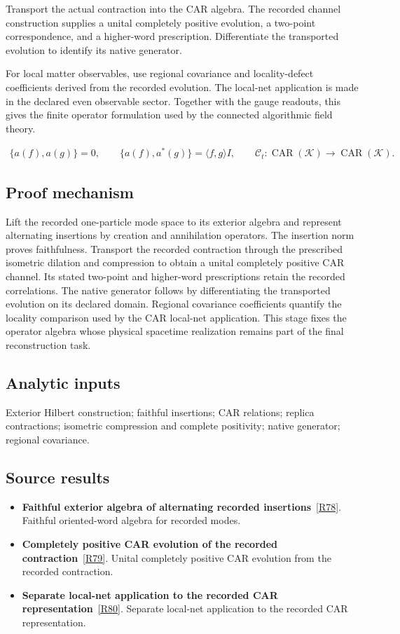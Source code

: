 \documentclass[11pt,a4paper]{article}
\begin{document}
Transport the actual contraction into the CAR algebra. The recorded channel construction supplies a unital completely positive evolution, a two-point correspondence, and a higher-word prescription. Differentiate the transported evolution to identify its native generator.

For local matter observables, use regional covariance and locality-defect coefficients derived from the recorded evolution. The local-net application is made in the declared even observable sector. Together with the gauge readouts, this gives the finite operator formulation used by the connected algorithmic field theory.


\begin{gather*}
\{a(f),a(g)\}=0,\qquad \{a(f),a^*(g)\}=\langle f,g\rangle I,
\qquad \mathcal C_t:\operatorname{CAR}(\mathcal K)\to\operatorname{CAR}(\mathcal K).
\end{gather*}
\subsection*{Proof mechanism}
Lift the recorded one-particle mode space to its exterior algebra and represent alternating insertions by creation and annihilation operators. The insertion norm proves faithfulness. Transport the recorded contraction through the prescribed isometric dilation and compression to obtain a unital completely positive CAR channel. Its stated two-point and higher-word prescriptions retain the recorded correlations. The native generator follows by differentiating the transported evolution on its declared domain. Regional covariance coefficients quantify the locality comparison used by the CAR local-net application. This stage fixes the operator algebra whose physical spacetime realization remains part of the final reconstruction task.
\subsection*{Analytic inputs}
Exterior Hilbert construction; faithful insertions; CAR relations; replica contractions; isometric compression and complete positivity; native generator; regional covariance.
\subsection*{Source results}
\begin{itemize}
\item \textbf{Faithful exterior algebra of alternating recorded insertions}~\hyperref[src:thm-lqft-oriented-word-algebra]{[R78]}. Faithful oriented-word algebra for recorded modes.
\item \textbf{Completely positive CAR evolution of the recorded contraction}~\hyperref[src:thm-lqft-record-car-channel]{[R79]}. Unital completely positive CAR evolution from the recorded contraction.
\item \textbf{Separate local-net application to the recorded CAR representation}~\hyperref[src:thm-ym-hk-record-instantiation]{[R80]}. Separate local-net application to the recorded CAR representation.
\end{itemize}
\end{document}
